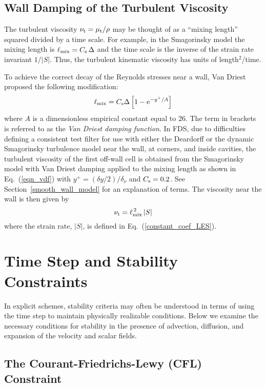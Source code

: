 \subsection{Wall Damping of the Turbulent Viscosity}
\label{sec:wall_damping}

The turbulent viscosity $\nu_{\rm t} = \mu_{\rm t}/\rho$ may be thought of as a ``mixing length'' squared divided by a time scale.  For example, in the Smagorinsky model the mixing length is $\ell_{\rm mix} = C_{\rm s} \,\Delta$ and the time scale is the inverse of the strain rate invariant $1/|S|$.  Thus, the turbulent kinematic viscosity has units of length$^2$/time.

To achieve the correct decay of the Reynolds stresses near a wall, Van Driest~\cite{Wilcox:1} proposed the following modification:
\begin{equation}
\label{eqn_vdf}
\ell_{\rm mix} = C_{\rm s} \Delta \left[ 1 - \mathrm{e}^{-y^+/A} \right]
\end{equation}
where $A$ is a dimensionless empirical constant equal to 26.  The term in brackets is referred to as the {\em Van Driest damping function}. In FDS, due to difficulties defining a consistent test filter for use with either the Deardorff or the dynamic Smagorinsky turbulence model near the wall, at corners, and inside cavities, the turbulent viscosity of the first off-wall cell is obtained from the Smagorinsky model with Van Driest damping applied to the mixing length as shown in Eq.~(\ref{eqn_vdf}) with $y^+ = (\delta y/2)/\delta_\nu$ and $C_{\rm s} = 0.2$.  See Section~\ref{smooth_wall_model} for an explanation of terms. The viscosity near the wall is then given by
\begin{equation}
   \nu_{\rm t} = \ell_{\rm mix}^{\,2}\,|S|  \label{eqn_nearwall_viscosity}
\end{equation}
where the strain rate, $|S|$, is defined in Eq.~(\ref{constant_coef_LES}).


\section{Time Step and Stability Constraints}
\label{stability}

In explicit schemes, stability criteria may often be understood in terms of using the time step to maintain physically realizable conditions.  Below we examine the necessary conditions for stability in the presence of advection, diffusion, and expansion of the velocity and scalar fields.

\subsection{The Courant-Friedrichs-Lewy (CFL) Constraint}

